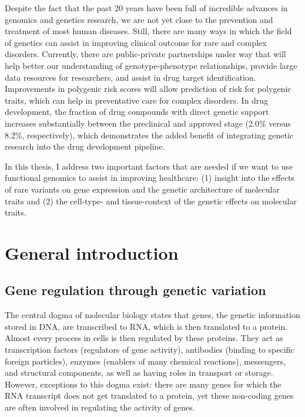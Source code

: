 Despite the fact that the past 20 years have been full of incredible advances in genomics and genetics research, we are not yet close to the prevention and treatment of most human diseases. Still, there are many ways in which the field of genetics can assist in improving clinical outcome for rare and complex disorders. Currently, there are public-private partnerships under way that will help better our understanding of genotype-phenotype relationships\cite{HomepageInternationalCommon}, provide large data resources for researchers\cite{fingennFinnGenDocumentationR32020,sudlowUKBiobankOpen2015}, and assist in drug target identification\cite{carvalho-silvaOpenTargetsPlatform2019}. Improvements in polygenic risk scores will allow prediction of risk for polygenic traits\cite{natarajanpradeepPolygenicRiskScore2017, kheraGenomewidePolygenicScores2018}, which can help in preventative care for complex disorders. In drug development, the fraction of drug compounds with direct genetic support increases substantially between the preclinical and approved stage (2.0\% versus 8.2\%, respectively\cite{nelsonSupportHumanGenetic2015}), which demonstrates the added benefit of integrating genetic research into the drug development pipeline. %


In this thesis, I address two important factors that are needed if we want to use functional genomics to assist in improving healthcare: (1) insight into the effects of rare variants on gene expression and the genetic architecture of molecular traits and (2) the cell-type- and tissue-context of the genetic effects on molecular traits.


\section{General introduction}

\subsection{Gene regulation through genetic variation}

The central dogma of molecular biology states that genes, the genetic information stored in DNA, are transcribed to RNA, which is then translated to a protein\cite{crickCentralDogmaMolecular1970}. Almost every process in cells is then regulated by these proteins. They act as transcription factors (regulators of gene activity), antibodies (binding to specific foreign particles), enzymes (enablers of many chemical reactions), messengers, and structural components, as well as having roles in transport or storage\cite{uzmanMolecularBiologyCell2003}. However, exceptions to this dogma exist: there are many genes for which the RNA transcript does not get translated to a protein, yet these non-coding genes are often involved in regulating the activity of genes\cite{shabalinaMammalianTranscriptomeFunction2004}. 


